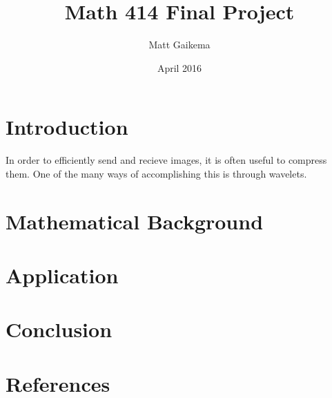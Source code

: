\documentclass{article}
\title{Math 414 Final Project}
\author{Matt Gaikema}
\date{April 2016}
\begin{document}
\maketitle

\section{Introduction}

In order to efficiently send and recieve images, it is often useful to compress them.
One of the many ways of accomplishing this is through wavelets.


\section{Mathematical Background}


\section{Application}


\section{Conclusion}


\section{References}
\end{document}

